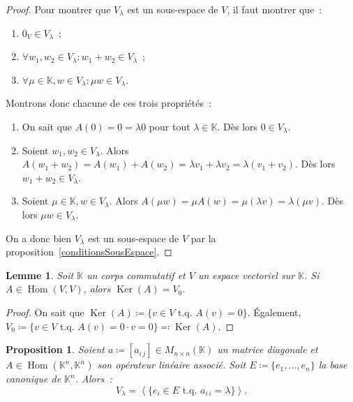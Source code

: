 \documentclass{article}
\DeclareMathOperator{\Ker}{Ker}
\DeclareMathOperator{\Hom}{Hom}
\newcommand{\K}{\mathbb K}
\newcommand{\eng}[1]{\left\langle#1\right\rangle}
\newcommand{\M}[3]{M_{#1 \times #2}(#3)}
\newcommand{\tq}{\textrm{ t.q. }}
\newtheorem{prp}[thm]{Proposition}
\newtheorem{lem}[thm]{Lemme}
\theoremstyle{definition}
\theoremstyle{remark}
\begin{document}
		\begin{proof} Pour montrer que $V_\lambda$ est un sous-espace de $V$, il faut montrer que~:
		\begin{enumerate}
			\item $0_V \in V_\lambda$~;
			\item $\forall w_1, w_2 \in V_\lambda : w_1 + w_2 \in V_\lambda$~;
			\item $\forall \mu \in \K, w \in V_\lambda : \mu w \in V_\lambda$.
		\end{enumerate}

		Montrons donc chacune de ces trois propriétés~:
		\begin{enumerate}
			\item On sait que $A(0) = 0 = \lambda 0$ pour tout $\lambda \in \K$. Dès lors $0 \in V_\lambda$.
			\item Soient $w_1, w_2 \in V_\lambda$. Alors $A(w_1 + w_2) = A(w_1) + A(w_2) = \lambda v_1 + \lambda v_2 = \lambda(v_1 + v_2)$.
			      Dès lors $w_1+w_2 \in V_\lambda$.
			\item Soient $\mu \in \K, w \in V_\lambda$. Alors $A(\mu w) = \mu A(w) = \mu (\lambda v) = \lambda(\mu v)$. Dès lors $\mu w \in V_\lambda$.
		\end{enumerate}

		On a donc bien $V_\lambda$ est un sous-espace de $V$ par la proposition~\ref{conditionsSousEspace}. \end{proof}

		\begin{lem} Soit $\K$ un corps commutatif et $V$ un espace vectoriel sur $\K$. Si $A \in \Hom(V, V)$, alors $\Ker(A) = V_0$. \end{lem}

		\begin{proof} On sait que $\Ker(A) \coloneqq \{v \in V \tq A(v) = 0\}$. Également, $V_0 \coloneqq \{v \in V \tq A(v) = 0 \cdot v = 0\} \eqqcolon \Ker(A)$.
		\end{proof}

		\begin{prp} Soient $a \coloneqq [a_{i\,j}] \in \M nn\K$ un matrice diagonale et $A \in \Hom(\K^n, \K^n)$ son opérateur linéaire associé.
		Soit $E \coloneqq \{e_1, \dotsc, e_n\}$ la base canonique de $\K^n$. Alors~: \[V_\lambda = \eng {\{e_i \in E \tq a_{i\,i} = \lambda\}}.\] \end{prp}
\end{document}
